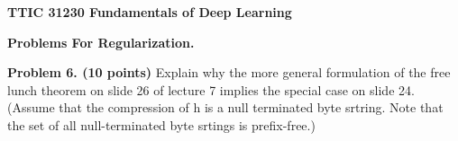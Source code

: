 \documentclass{article}
\begin{document}
\centerline{\bf TTIC 31230 Fundamentals of Deep Learning}
\bigskip
\centerline{\bf Problems For Regularization.}

\bigskip
\bigskip

{\bf Problem 6. (10 points)} Explain why the more general formulation of the free lunch theorem on slide 26 of lecture 7 implies the special case on slide 24.
(Assume that the compression of h is a null terminated byte srtring.  Note that the set of all null-terminated byte srtings is prefix-free.)
  
\end{document}
